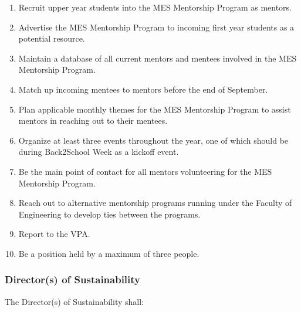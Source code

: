 \begin{enumerate}
 \item
  Recruit upper year students into the MES Mentorship Program as mentors.
 \item
  Advertise the MES Mentorship Program to incoming first year students as a potential resource.
 \item
  Maintain a database of all current mentors and mentees involved in the MES Mentorship Program.
 \item
  Match up incoming mentees to mentors before the end of September.
 \item
  Plan applicable monthly themes for the MES Mentorship Program to assist mentors in reaching out to their mentees.
 \item
  Organize at least three events throughout the year, one of which should be during Back2School Week as a kickoff event.
 \item
  Be the main point of contact for all mentors volunteering for the MES Mentorship Program.
 \item
  Reach out to alternative mentorship programs running under the Faculty of Engineering to develop ties between the programs.
 \item
  Report to the VPA.
 \item
  Be a position held by a maximum of three people.

\end{enumerate}

\subsubsection{Director(s) of Sustainability}
\label{directors-of-sustainability}
The Director(s) of Sustainability shall:

